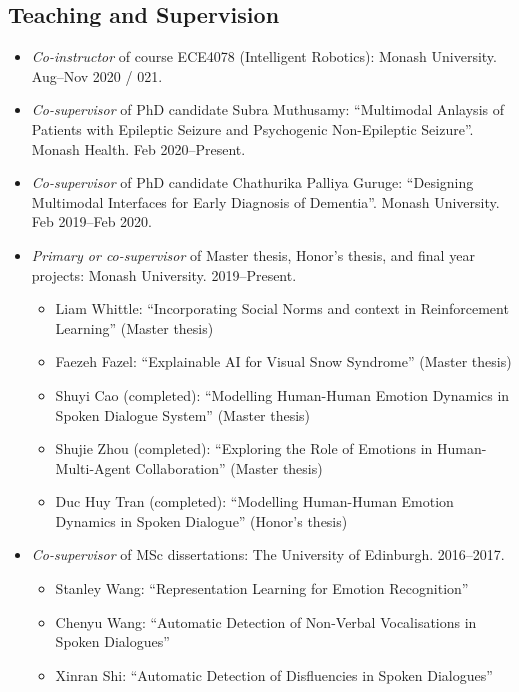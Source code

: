 \documentclass[11pt,letterpaper]{article}
\begin{document}
\subsection*{Teaching and Supervision}
\begin{itemize}
  \item \emph{Co-instructor} of course ECE4078 (Intelligent Robotics): Monash University. Aug--Nov 2020 / 021.
  \item \emph{Co-supervisor} of PhD candidate Subra Muthusamy: ``Multimodal Anlaysis of Patients with Epileptic Seizure and Psychogenic Non-Epileptic Seizure''. Monash Health. Feb 2020--Present.
  \item \emph{Co-supervisor} of PhD candidate Chathurika Palliya Guruge: ``Designing Multimodal Interfaces for Early Diagnosis of Dementia''. Monash University. Feb 2019--Feb 2020.
  \item \emph{Primary or co-supervisor} of Master thesis, Honor's thesis, and final year projects: Monash University. 2019--Present.
  \begin{itemize}
    \item Liam Whittle: ``Incorporating Social Norms and context in Reinforcement Learning'' (Master thesis)
    \item Faezeh Fazel: ``Explainable AI for Visual Snow Syndrome'' (Master thesis)
	\item Shuyi Cao (completed): ``Modelling Human-Human Emotion Dynamics in Spoken Dialogue System'' (Master thesis)
    \item Shujie Zhou (completed): ``Exploring the Role of Emotions in Human-Multi-Agent Collaboration'' (Master thesis)
    \item Duc Huy Tran (completed): ``Modelling Human-Human Emotion Dynamics in Spoken Dialogue'' (Honor's thesis)
  \end{itemize}
  \item \emph{Co-supervisor} of MSc dissertations: The University of Edinburgh. 2016--2017.
  \begin{itemize}
    \item Stanley Wang: ``Representation Learning for Emotion Recognition''
    \item Chenyu Wang: ``Automatic Detection of Non-Verbal Vocalisations in Spoken Dialogues''
    \item Xinran Shi: ``Automatic Detection of Disfluencies in Spoken Dialogues''
  \end{itemize}
\end{itemize}
\end{document}
